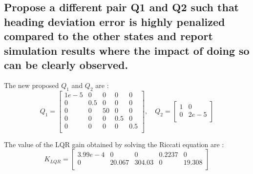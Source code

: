 \subsection{Propose a different pair Q1 and Q2 such that heading deviation error is highly penalized compared to the other states and report simulation results where the impact of doing so can be clearly observed.}
The new proposed $Q_1$ and $Q_2$ are :
\begin{equation}
    Q_1 = 
    \left[ {\begin{array}{ccccc}
        1e-5 &0   &0   &0   &0     \\
        0    &0.5 &0   &0   &0     \\
        0    &0   &50  &0   &0     \\
        0    &0   &0   &0.5 &0     \\
        0    &0   &0   &0   &0.5   \\
    \end{array} } \right]    
    ,\quad
    Q_2 =
    \left[ {\begin{array}{cc}
        1 &0\\
        0 &2e-5\\
    \end{array} } \right]
\end{equation}

The value of the LQR gain obtained by solving the Riccati equation are :
\begin{equation}
    K_{LQR} = 
    \left[ {\begin{array}{ccccc}
         3.99e-4 &0       &0       &0.2237 &0      \\
         0         &20.067 &304.03 &0      &19.308 \\
    \end{array}}\right]
\end{equation}

